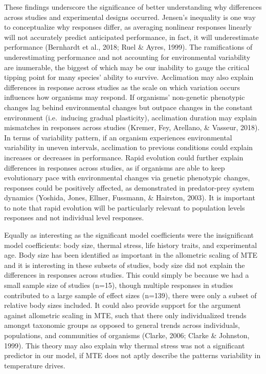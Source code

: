 \documentclass[12pt,twoside]{reedthesis}
\begin{document}
These findings underscore the significance of better understanding why differences across studies and experimental designs occurred. Jensen's inequality is one way to conceptualize why responses differ, as averaging nonlinear responses linearly will not accurately predict anticipated performance, in fact, it will underestimate performance (Bernhardt et al., 2018; Ruel \& Ayres, 1999). The ramifications of underestimating performance and not accounting for environmental variability are inumerable, the biggest of which may be our inability to gauge the critical tipping point for many species' ability to survive. Acclimation may also explain differences in response across studies as the scale on which variation occurs influences how organisms may respond. If organisms' non-genetic phenotypic changes lag behind environmental changes but outpace changes in the constant environment (i.e.~inducing gradual plasticity), acclimation duration may explain mismatches in responses across studies (Kremer, Fey, Arellano, \& Vasseur, 2018). In terms of variability pattern, if an organism experiences environmental variability in uneven intervals, acclimation to previous conditions could explain increases or decreases in performance. Rapid evolution could further explain differences in responses across studies, as if organisms are able to keep evolutionary pace with environmental changes via genetic phenotypic changes, responses could be positively affected, as demonstrated in predator-prey system dynamics (Yoshida, Jones, Ellner, Fussmann, \& Hairston, 2003). It is important to note that rapid evolution will be particularly relevant to population levels responses and not individual level responses.

Equally as interesting as the significant model coefficients were the insignificant model coefficients: body size, thermal stress, life history traits, and experimental age. Body size has been identified as important in the allometric scaling of MTE and it is interesting in these subsets of studies, body size did not explain the differences in responses across studies. This could simply be because we had a small sample size of studies (n=15), though multiple responses in studies contributed to a large sample of effect sizes (n=139), there were only a subset of relative body sizes included. It could also provide support for the argument against allometric scaling in MTE, such that there only individualized trends amongst taxonomic groups as opposed to general trends across individuals, populations, and communities of organisms (Clarke, 2006; Clarke \& Johnston, 1999). This theory may also explain why thermal stress was not a significant predictor in our model, if MTE does not aptly describe the patterns variability in temperature drives.
\end{document}
